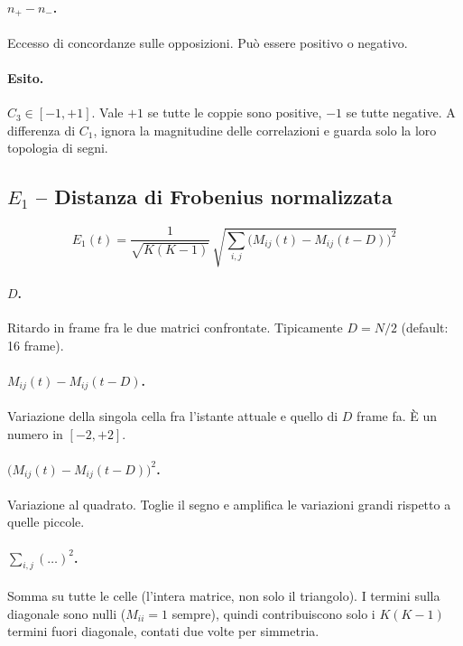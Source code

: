 \documentclass[a4paper,11pt]{article}
\begin{document}
\paragraph{$n_+ - n_-$.} Eccesso di concordanze sulle opposizioni. Può
essere positivo o negativo.

\paragraph{Esito.} $C_3 \in [-1, +1]$. Vale $+1$ se tutte le coppie sono
positive, $-1$ se tutte negative. A differenza di $C_1$, ignora la
magnitudine delle correlazioni e guarda solo la loro topologia di segni.

\subsection{$E_1$ -- Distanza di Frobenius normalizzata}

\[
E_1(t) = \frac{1}{\sqrt{K(K-1)}}\,
        \sqrt{\sum_{i,j} \bigl( M_{ij}(t) - M_{ij}(t-D) \bigr)^2}
\]

\paragraph{$D$.} Ritardo in frame fra le due matrici confrontate.
Tipicamente $D = N/2$ (default: 16 frame).

\paragraph{$M_{ij}(t) - M_{ij}(t-D)$.} Variazione della singola cella
fra l'istante attuale e quello di $D$ frame fa. È un numero in
$[-2, +2]$.

\paragraph{$\bigl( M_{ij}(t) - M_{ij}(t-D) \bigr)^2$.} Variazione al
quadrato. Toglie il segno e amplifica le variazioni grandi rispetto a
quelle piccole.

\paragraph{$\sum_{i,j} (\dots)^2$.} Somma su tutte le celle (l'intera
matrice, non solo il triangolo). I termini sulla diagonale sono nulli
($M_{ii} = 1$ sempre), quindi contribuiscono solo i $K(K-1)$ termini
fuori diagonale, contati due volte per simmetria.
\end{document}
